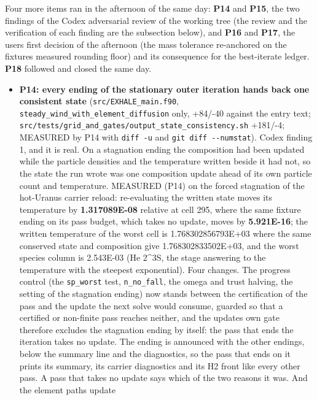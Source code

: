 \documentclass[english,a4paper]{my_memo}
\begin{document}
Four more items ran in the afternoon of the same day: \textbf{P14} and \textbf{P15}, the
two findings of the Codex adversarial review of the working tree (the review
and the verification of each finding are the subsection below), and \textbf{P16} and
\textbf{P17}, the user\textquotesingle s first decision of the afternoon (the mass tolerance
re-anchored on the fixture\textquotesingle s measured rounding floor) and its consequence for
the best-iterate ledger. \textbf{P18} followed and closed the same day.

\begin{itemize}
\item
  \textbf{P14: every ending of the stationary outer iteration hands back one
  consistent state} (\texttt{src/EXHALE\_main.f90}, \texttt{steady\_wind\_with\_element\_diffusion}
  only, +84/-40 against the entry text;
  \texttt{src/tests/grid\_and\_gates/output\_state\_consistency.sh} +181/-4; MEASURED by
  P14 with \texttt{diff\ -u} and \texttt{git\ diff\ -\/-numstat}). Codex finding 1, and it is
  real. On a stagnation ending the composition had been updated while the
  particle densities and the temperature written beside it had not, so the
  state the run wrote was one composition update ahead of its own particle
  count and temperature. MEASURED (P14) on the forced stagnation of the
  hot-Uranus carrier reload: re-evaluating the written state moves its
  temperature by \textbf{1.317089E-08} relative at cell 295, where the same fixture
  ending on its pass budget, which takes no update, moves by \textbf{5.921E-16}; the
  written temperature of the worst cell is 1.768302856793E+03 where the same
  conserved state and composition give 1.768302833502E+03, and the worst
  species column is 2.543E-03 (He 2\^{}3S, the stage answering to the temperature
  with the steepest exponential). Four changes. The progress control (the
  \texttt{sp\_worst} test, \texttt{n\_no\_fall}, the omega and trust halving, the setting of the
  stagnation ending) now stands between the certification of the pass and the
  update the next solve would consume, guarded so that a certified or
  non-finite pass reaches neither, and the update\textquotesingle s own gate therefore excludes
  the stagnation ending by itself: the pass that ends the iteration takes no
  update. The ending is announced with the other endings, below the summary
  line and the diagnostics, so the pass that ends on it prints its summary, its
  carrier diagnostics and its H2 front like every other pass. A pass that takes
  no update says which of the two reasons it was. And the element path\textquotesingle s update

\end{itemize}
\end{document}
